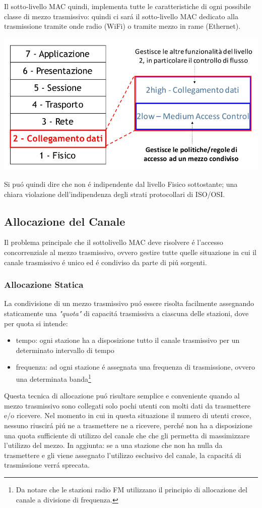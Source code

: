 \documentclass[12pt]{article}
\begin{document}
Il sotto-livello MAC quindi, implementa tutte le caratteristiche di ogni possibile classe di mezzo trasmissivo: quindi ci 
sar\'a il sotto-livello MAC dedicato alla trasmissione tramite onde radio (WiFi) o tramite mezzo in rame (Ethernet).
\begin{center}
	\includegraphics[scale=0.45]{livello_collegamento-img3.png}
\end{center}
Si pu\'o quindi dire che non \'e indipendente dal livello Fisico sottostante; una chiara violazione dell'indipendenza degli 
strati protocollari di ISO/OSI.

\clearpage
\subsection{Allocazione del Canale}\label{mac-allorazione-canale}
Il problema principale che il sottolivello MAC deve risolvere \'e l'accesso concorrenziale al mezzo trasmissivo, ovvero 
gestire tutte quelle situazione in cui il canale trasmissivo \'e unico ed \'e condiviso da parte di pi\'u sorgenti.

\subsubsection{Allocazione Statica}
La condivisione di un mezzo trasmissivo pu\'o essere risolta facilmente assegnando staticamente una \textit{"quota"} di 
capacit\'a trasmissiva a ciascuna delle stazioni, dove per quota si intende:
\begin{itemize}[noitemsep]
	\item tempo: ogni stazione ha a disposizione tutto il canale trasmissivo per un determinato intervallo di tempo
	\item frequenza: ad ogni stazione \'e assegnata una frequenza di trasmissione, ovvero una determinata banda\footnote{Da 
	      notare che le stazioni radio FM utilizzano il principio di allocazione del canale a divisione di frequenza.}
\end{itemize}
Questa tecnica di allocazione pu\'o risultare semplice e conveniente quando al mezzo trasmissivo sono collegati solo pochi 
utenti con molti dati da trasmettere e/o ricevere. Nel momento in cui in questa situazione il numero di utenti cresce, 
nessuno riuscir\'a pi\'u ne a trasmettere ne a ricevere, perch\'e non ha a disposizione una quota sufficiente di utilizzo del 
canale che che gli permetta di massimizzare l'utilizzo del mezzo. In aggiunta: se a una stazione che non ha nulla da 
trasmettere e gli viene assegnato l'utilizzo esclusivo del canale, la capacit\'a di trasmissione verr\'a sprecata.
\end{document}

